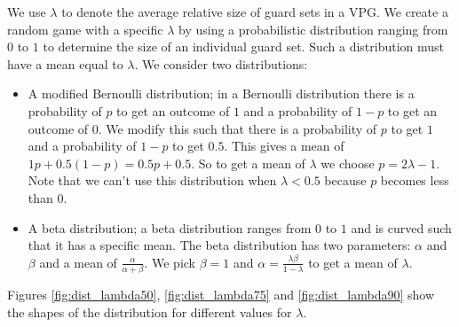 We use $\lambda$ to denote the average relative size of guard sets in a VPG. We create a random game with a specific $\lambda$ by using a probabilistic distribution ranging from $0$ to $1$ to determine the size of an individual guard set. Such a distribution must have a mean equal to $\lambda$. We consider two distributions:
\begin{itemize}
	\item A modified Bernoulli distribution; in a Bernoulli distribution there is a probability of $p$ to get an outcome of $1$ and a probability of $1-p$ to get an outcome of $0$. We modify this such that there is a probability of $p$ to get $1$ and a probability of $1-p$ to get $0.5$. This gives a mean of $1p + 0.5(1-p) = 0.5p + 0.5$. So to get a mean of $\lambda$ we choose $p = 2\lambda - 1$. Note that we can't use this distribution when $\lambda < 0.5$ because $p$ becomes less than $0$.
	\item A beta distribution; a beta distribution ranges from $0$ to $1$ and is curved such that it has a specific mean. The beta distribution has two parameters: $\alpha$ and $\beta$ and a mean of $\frac{\alpha}{\alpha+\beta}$. We pick $\beta=1$ and $\alpha = \frac{\lambda\beta}{1-\lambda}$ to get a mean of $\lambda$.
\end{itemize}
Figures \ref{fig:dist_lambda50}, \ref{fig:dist_lambda75} and \ref{fig:dist_lambda90} show the shapes of the distribution for different values for $\lambda$.
